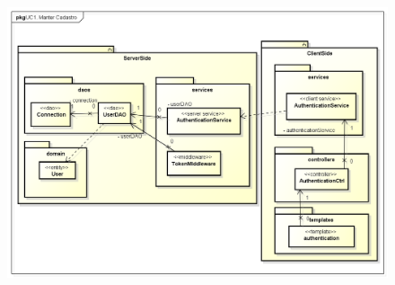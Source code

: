 \begin{figure}
\begin{minipage}{1.0\textwidth}
    \centerline{\includegraphics[width=35em]{figuras/authClasses.png}}
    \label{fig:authclasses}
\end{minipage}
\end{figure}

